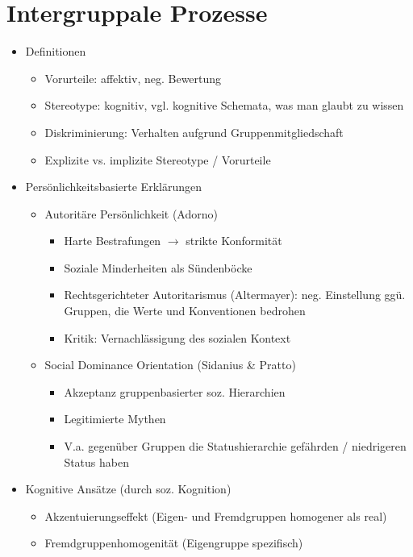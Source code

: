 \documentclass[11pt, paper=a4, twocolumn]{scrartcl}
\begin{document}
	\section{Intergruppale Prozesse}
		\begin{itemize}
			\item Definitionen
				\begin{itemize}
					\item Vorurteile: affektiv, neg. Bewertung
					\item Stereotype: kognitiv, vgl. kognitive Schemata, was man glaubt zu wissen
					\item Diskriminierung: Verhalten aufgrund Gruppenmitgliedschaft
					\item Explizite vs. implizite Stereotype / Vorurteile
				\end{itemize}
			\item Persönlichkeitsbasierte Erklärungen
				\begin{itemize}
					\item Autoritäre Persönlichkeit (Adorno)
						\begin{itemize}
							\item Harte Bestrafungen $\rightarrow$ strikte Konformität
							\item Soziale Minderheiten als Sündenböcke
							\item Rechtsgerichteter Autoritarismus (Altermayer): neg. Einstellung ggü. Gruppen, die Werte 
								und Konventionen bedrohen
							\item Kritik: Vernachlässigung des sozialen Kontext
						\end{itemize}
					\item Social Dominance Orientation (Sidanius \& Pratto)
						\begin{itemize}
							\item Akzeptanz gruppenbasierter soz. Hierarchien
							\item Legitimierte Mythen
							\item V.a. gegenüber Gruppen die Statushierarchie gefährden / niedrigeren Status haben
						\end{itemize}
				\end{itemize}
			\item Kognitive Ansätze (durch soz. Kognition)
				\begin{itemize}
					\item Akzentuierungseffekt (Eigen- und Fremdgruppen homogener als real)
					\item Fremdgruppenhomogenität (Eigengruppe spezifisch)

\end{itemize}
\end{itemize}
\end{document}
